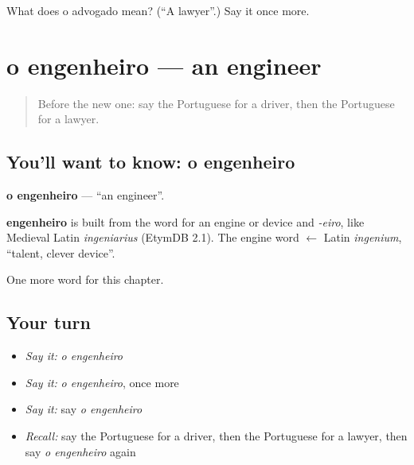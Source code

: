 \begin{tcolorbox}[breakable,colback=teal!4,colframe=teal!35!black,title={Before you move on}]
What does o advogado mean? (\textquotedblleft{}A lawyer\textquotedblright{}.) Say it once more.
\end{tcolorbox}
\section[o engenheiro]{o engenheiro — an engineer}

\label{lesson:PT-C111-engenheiro}



\begin{quote}
Before the new one: say the Portuguese for a driver, then the Portuguese for a lawyer.
\end{quote}

\subsection*{You'll want to know: o engenheiro}
\textbf{o engenheiro} — \textquotedblleft{}an engineer\textquotedblright{}.

\begin{cousinweb}
\textbf{engenheiro} is built from the word for an engine or device and \emph{-eiro}, like Medieval Latin \emph{ingeniarius} (EtymDB 2.1). The engine word $\leftarrow$ Latin \emph{ingenium}, \textquotedblleft{}talent, clever device\textquotedblright{}.
\end{cousinweb}

\begin{grammarlens}[title={What you've built}]
One more word for this chapter.
\end{grammarlens}

\subsection*{Your turn}
\begin{itemize}
\raggedright
  \item \emph{Say it:} \emph{o engenheiro}
  \item \emph{Say it:} \emph{o engenheiro}, once more
  \item \emph{Say it:} say \emph{o engenheiro}
  \item \emph{Recall:} say the Portuguese for a driver, then the Portuguese for a lawyer, then say \emph{o engenheiro} again
\end{itemize}

